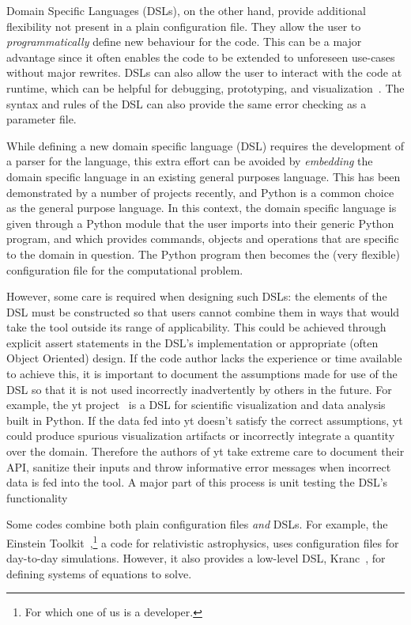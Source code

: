 \documentclass[conference]{IEEEtran}
\begin{document}
Domain Specific Languages (DSLs), on the other hand,
provide additional flexibility not present in a plain configuration file.
They allow the user to \textit{programmatically} define new behaviour for the code.
This can be a major advantage since it often enables the code to be extended to
unforeseen use-cases without major rewrites.
DSLs can also allow the user to interact with the code at runtime, which can be
helpful for debugging, prototyping, and visualization~\cite{Beg:2016}.
The syntax and rules of the DSL can also provide the same error checking as a
parameter file.

While defining a new domain specific language (DSL) requires
the development of a parser for the language, 
this extra effort can be avoided by
\emph{embedding} the domain specific language in an existing general
purposes language. This has been demonstrated by a number of projects
recently, and Python is a common choice as the general purpose
language. In this context, the domain specific language is given
through a Python module that the user imports into their generic
Python program, and which provides commands, objects and operations
that are specific to the domain in question. The Python program 
then becomes the (very flexible) configuration file for the computational problem.

However, some care is required when designing such DSLs: the elements
of the DSL must be constructed so that users cannot combine them in
ways that would take the tool outside its range of applicability. This
could be achieved through explicit assert statements in the DSL's
implementation or appropriate (often Object Oriented) design. If the
code author lacks the experience or time available to achieve this, it
is important to document the assumptions made for use of the DSL so
that it is not used incorrectly inadvertently by others in the future. For 
example, the yt project~\cite{2011ApJS..192....9T} is a DSL for scientific 
visualization and data analysis built in Python. If the data fed into yt 
doesn't satisfy the correct assumptions, yt could produce spurious 
visualization artifacts or incorrectly integrate a quantity over the domain. 
Therefore the authors of yt take extreme care to document their API, 
sanitize their inputs and throw informative error messages when incorrect 
data is fed into the tool. A major part of this process is unit testing the 
DSL's functionality

Some codes combine both plain configuration files \textit{and} DSLs.
For example, the Einstein Toolkit~\cite{Loffler:2011ay},\footnote{For which one 
of us is a developer.} a code for relativistic astrophysics, uses configuration 
files for day-to-day simulations. However, it also provides a low-level DSL, 
Kranc~\cite{Husa:2004ip}, for defining systems of equations to solve.
\end{document}
